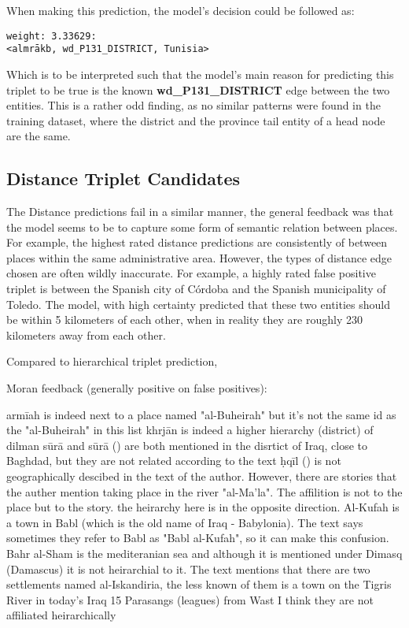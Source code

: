 When making this prediction, the model's decision could be followed as:
\begin{verbatim}
weight: 3.33629:
<almrākb, wd_P131_DISTRICT, Tunisia>
\end{verbatim}
Which is to be interpreted such that the model's main reason for predicting this triplet to be true is
the known \textbf{wd\_P131\_DISTRICT} edge between the two entities.
This is a rather odd finding, as no similar patterns were found in the training dataset, where the district and
the province tail entity of a head node are the same.


\subsection{Distance Triplet Candidates}
The Distance predictions fail in a similar manner, the general feedback was that the model seems to be to capture
some form of semantic relation between places.
For example, the highest rated distance predictions are consistently of between places within the same
administrative area.
However, the types of distance edge chosen are often wildly inaccurate.
For example, a highly rated false positive triplet is between the Spanish city of Córdoba and the Spanish municipality
of Toledo.
The model, with high certainty predicted that these two entities should be within 5 kilometers of each other, when
in reality they are roughly 230 kilometers away from each other.



Compared to hierarchical triplet prediction,


Moran feedback (generally positive on false positives):

armīah is indeed next to a place named "al-Buheirah" but it's not the same id as the "al-Buheirah"  in this list
khrjān is indeed a higher hierarchy (district) of dilman
sūrā and sūrā () are both mentioned in the disrtict of Iraq, close to Baghdad, but they are not related according to the text
ḥqīl () is not geographically descibed in the text of the author.
However, there are stories that the auther mention taking place in the river "al-Ma'la".
The affilition is not to the place but to the story.
the heirarchy here is in the opposite direction.
Al-Kufah is a town in Babl (which is the old name of Iraq - Babylonia).
The text says sometimes they refer to Babl as "Babl al-Kufah", so it can make this confusion.
Bahr al-Sham is the mediteranian sea and although it is mentioned under Dimasq (Damascus) it is not heirarchial to it.
The text mentions that there are two settlements named al-Iskandiria,
the less known of them is a town on the Tigris River in today's Iraq 15 Parasangs (leagues) from Wast
I think they are not affiliated heirarchically
